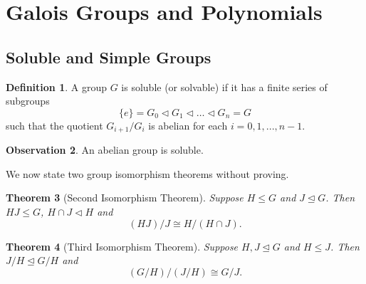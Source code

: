 \documentclass[12pt]{article}
\newtheorem{theorem}{Theorem}
\theoremstyle{definition}
\newtheorem{definition}[theorem]{Definition}
\newtheorem{observation}[theorem]{\textbf{Observation}}
\begin{document}
\section{Galois Groups and Polynomials}


\subsection{Soluble and Simple Groups}

\begin{definition} \label{def:soluble}
    A group $G$ is soluble (or solvable) if it has a finite series of subgroups 
    $$ \{ e \} = G_0 \triangleleft G_1 \triangleleft \dots \triangleleft G_n = G$$
    such that the quotient $G_{i+1} / G_{i}$ is abelian for each $i = 0, 1, ...,  n - 1$.
\end{definition}

\begin{observation}
    An abelian group is soluble. 
\end{observation}

We now state two group isomorphism theorems without proving. 

\begin{theorem}[Second Isomorphism Theorem] \label{thm:second-iso}
    Suppose $H \le G$ and $J \trianglelefteq G$. Then $HJ \le G$, $H \cap J \triangleleft H$ and $$
    (HJ) / J \cong H / (H \cap J). 
    $$
\end{theorem}
\begin{theorem}[Third Isomorphism Theorem] \label{thm:third-iso}
    Suppose $H, J \trianglelefteq G$ and $H \le J$. Then $J/H \trianglelefteq G/H$ and $$
    (G/H)/(J/H) \cong G / J.    $$
\end{theorem}
\end{document}
